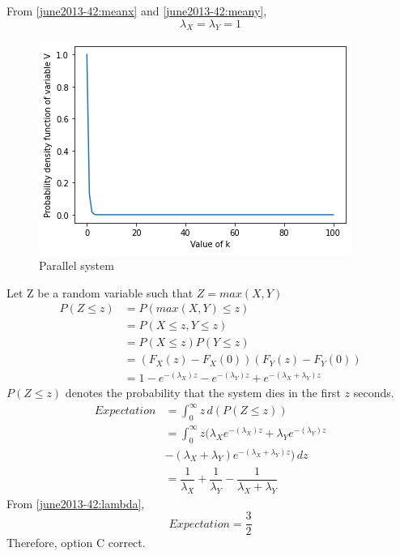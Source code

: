 From \ref{june2013-42:meanx} and \ref{june2013-42:meany},
\begin{equation}\label{june2013-42:lambda}
    \lambda_X = \lambda_Y = 1
\end{equation}
\begin{figure}[h]
    \centering
    \includegraphics[width=\columnwidth]{solutions/2013/june/42/figures/figure.png}
    \caption{Parallel system}
    \label{june2013-42:fig:fig_label}
\end{figure}
Let Z be a random variable such that $Z=max(X,Y)$
\begin{align}
    P(Z\leq z) &= P(max(X,Y) \leq z)
    \\
    &=P(X\leq z,Y\leq z)
    \\
    &=P(X\leq z) P(Y\leq z)
    \\
    &=(F_X(z)-F_X(0)) (F_Y(z)-F_Y(0))
    \\
    &=1-e^{-(\lambda_X) z}-e^{-(\lambda_Y) z}+e^{-(\lambda_X+\lambda_Y) z}
\end{align}
$P(Z\leq z)$ denotes the probability that the system dies in the first $z$ seconds.\\
\begin{align}
    Expectation &= \int_{0}^{\infty}z \,d(P(Z\leq z))
    \\
\nonumber    &=\int_{0}^{\infty}z(\lambda_Xe^{-(\lambda_X) z}+\lambda_Ye^{-(\lambda_Y) z}\\
&-(\lambda_X+\lambda_Y)e^{-(\lambda_X+\lambda_Y) z}) \,dz
    \\
    &= \dfrac{1}{\lambda_X}+\dfrac{1}{\lambda_Y}-\dfrac{1}{\lambda_X+\lambda_Y}
\end{align}
From \ref{june2013-42:lambda}, 
\begin{equation}
    Expectation=\dfrac{3}{2}
\end{equation}
Therefore, option C correct.
